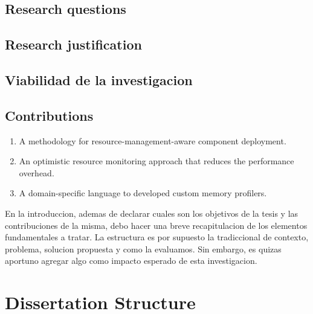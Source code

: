 \subsection{Research questions}

\subsection{Research justification}

\subsection{Viabilidad de la investigacion}

\subsection{Contributions}
\begin{enumerate}
\item A methodology for resource-management-aware component deployment.
\item An optimistic resource monitoring approach that reduces the performance overhead.
\item A domain-specific language to developed custom memory profilers.
\end{enumerate}

En la introduccion, ademas de declarar cuales son los objetivos de la tesis y las contribuciones de la misma, debo hacer una breve recapitulacion de los elementos fundamentales a tratar. La estructura es por supuesto la tradiccional de contexto, problema, solucion propuesta y como la evaluamos. Sin embargo, es quizas aportuno agregar algo como impacto esperado de esta investigacion. 

\fi

\section{Dissertation Structure}